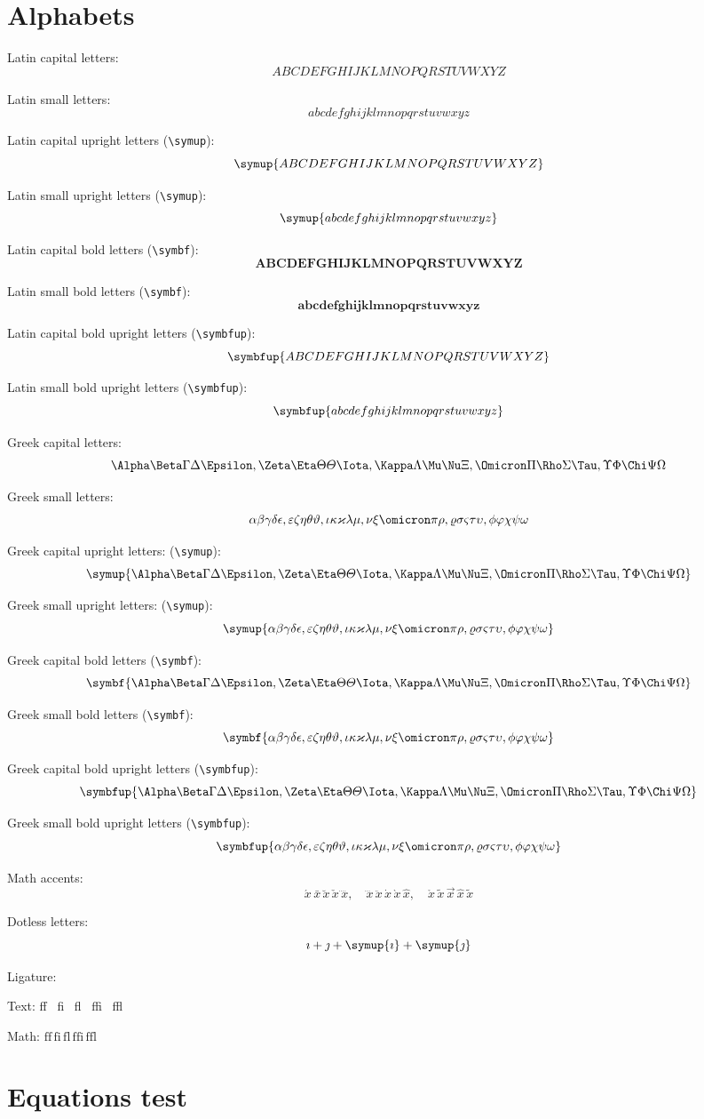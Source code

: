 \documentclass{article}
\def\Latinalphabets{ABCDEFGHIJKLMNOPQRSTUVWXYZ}
\def\latinalphabets{abcdefghijklmnopqrstuvwxyz}
\def\Greekalphabets{
  \Alpha      \Beta       \Gamma      \Delta      \Epsilon   ,
  \Zeta       \Eta        \Theta      \varTheta   \Iota      ,
  \Kappa      \Lambda     \Mu         \Nu         \Xi        ,
  \Omicron    \Pi         \Rho        \Sigma      \Tau       ,
  \Upsilon    \Phi        \Chi        \Psi        \Omega
}
\def\greekalphabets{
  \alpha      \beta       \gamma      \delta      \epsilon   ,
  \varepsilon \zeta       \eta        \theta      \vartheta  ,
  \iota       \kappa      \varkappa   \lambda     \mu        ,
  \nu         \xi         \omicron    \pi         \rho       ,
  \varrho     \sigma      \varsigma   \tau        \upsilon   ,
  \phi        \varphi     \chi        \psi        \omega
}
\def\ligaturetext{ff \, fi \, fl \, ffi \, ffl}
\begin{document}
\section{Alphabets}

Latin capital letters:
\[ \Latinalphabets \]

Latin small letters:
\[ \latinalphabets \]

Latin capital upright letters (\verb|\symup|):
\[ \symup{\Latinalphabets} \]

Latin small upright letters (\verb|\symup|):
\[ \symup{\latinalphabets} \]

Latin capital bold letters (\verb|\symbf|):
\[ \symbf{\Latinalphabets} \]

Latin small bold letters (\verb|\symbf|):
\[ \symbf{\latinalphabets} \]

Latin capital bold upright letters (\verb|\symbfup|):
\[ \symbfup{\Latinalphabets} \]

Latin small bold upright letters (\verb|\symbfup|):
\[ \symbfup{\latinalphabets} \]

Greek capital letters:
\[ \Greekalphabets \]

Greek small letters:
\[ \greekalphabets \]

Greek capital upright letters: (\verb|\symup|):
\[ \symup{\Greekalphabets} \]

Greek small upright letters: (\verb|\symup|):
\[ \symup{\greekalphabets} \]

Greek capital bold letters (\verb|\symbf|):
\[ \symbf{\Greekalphabets} \]

Greek small bold letters (\verb|\symbf|):
\[ \symbf{\greekalphabets} \]

Greek capital bold upright letters (\verb|\symbfup|):
\[ \symbfup{\Greekalphabets} \]

Greek small bold upright letters (\verb|\symbfup|):
\[ \symbfup{\greekalphabets} \]

Math accents:
\[
  \acute{x}    \, \bar{x}   \, \breve{x} \, \check{x}   \, \ddddot{x}    , \quad
  \dddot{x}    \, \ddot{x}  \, \dot{x}   \, \grave{x}   \, \hat{x}       , \quad
  \mathring{x} \, \tilde{x} \, \vec{x}   \, \widehat{x} \, \widetilde{x}
\]

Dotless letters:
\[ \imath + \jmath + \symup{\imath} + \symup{\jmath} \]

Ligature:

Text: {\firatext\ligaturetext}

Math: $\mathrm{\ligaturetext}$

\section{Equations test}
\end{document}

